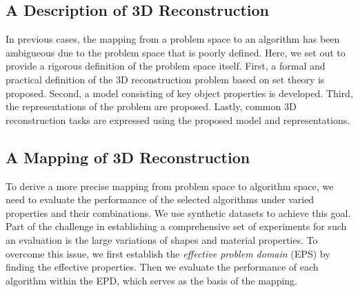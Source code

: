 \subsection{A Description of 3D Reconstruction}
In previous cases, the mapping from a problem space to an algorithm has been ambigueous due to the problem space that is poorly defined. Here, we set out to provide a rigorous definition of the problem space itself. First, a formal and practical definition of the 3D reconstruction problem based on set theory is proposed. Second, a model consisting of key object properties is developed. Third, the representations of the problem are proposed. Lastly, common 3D reconstruction tasks are expressed using the proposed model and representations.



\subsection{A Mapping of 3D Reconstruction}
To derive a more precise mapping from problem space to algorithm space, we need to evaluate the performance of the selected algorithms under varied properties and their combinations. We use synthetic datasets to achieve this goal. Part of the challenge in establishing a comprehensive set of experiments for such an evaluation is the large variations of shapes and material properties. To overcome this issue, we first establish the \textit{effective problem domain} (EPS) by finding the effective properties. Then we evaluate the performance of each algorithm within the EPD, which serves as the basis of the mapping.


